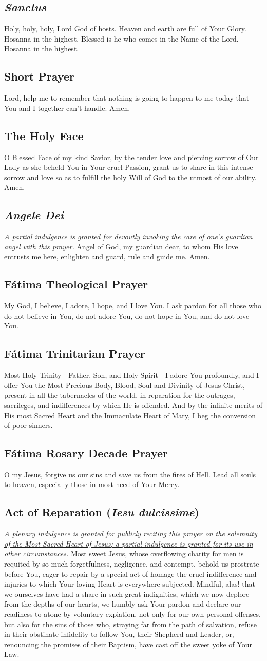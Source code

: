 \documentclass[12pt]{article}
\newcommand{\prayertitle}[1]{\subsection{#1}}
\newcommand{\indulgencedprayertitle}[1]{\prayertitle{#1 \protect\kreuz}}
\newcommand{\emphasis}[1]{\emph{#1}}
\newcommand{\emphasis}[1]{\textsl{#1}}
\newcommand{\foreign}[1]{\emphasis{#1}}
\newcommand{\note}[1]{{\small{\emphasis{#1}}}\newline}
\newcommand{\linkednote}[2]{\hyperlink{#1}{\note{#2}}}
\begin{document}
\prayertitle{\foreign{Sanctus}}
\label{prayer:sanctus}
Holy, holy, holy, Lord God of hosts.
Heaven and earth are full of Your Glory.
Hosanna in the highest.
Blessed is he who comes in the Name of the Lord.
Hosanna in the highest.

\prayertitle{Short Prayer}
\label{prayer:short}
Lord, help me to remember that nothing is going to happen to me today that You and I together can't handle. Amen.

\prayertitle{The Holy Face}
\label{prayer:holy_face}
O Blessed Face of my kind Savior, by the tender love and piercing sorrow of Our Lady as she beheld You in Your cruel Passion, grant us to share in this intense sorrow and love
so as to fulfill the holy Will of God to the utmost of our ability.
Amen.

\indulgencedprayertitle{\foreign{Angele Dei}}
\linkednote{grant18}{A partial indulgence is granted for devoutly invoking the care of one's guardian angel with this prayer.}
Angel of God, my guardian dear, to whom His love entrusts me here, enlighten and guard, rule and guide me. Amen.

\prayertitle{F\'{a}tima Theological Prayer}
My God, I believe, I adore, I hope, and I love You. I ask pardon for all those who do not believe in You, do not adore You, do not hope in You, and do not love You.

\prayertitle{F\'{a}tima Trinitarian Prayer}
Most Holy Trinity - Father, Son, and Holy Spirit - I adore You profoundly, and I offer You the Most Precious Body, Blood, Soul and Divinity of Jesus Christ, present in all the tabernacles of the world, in reparation for the outrages, sacrileges, and indifferences by which He is offended.
And by the infinite merits of His most Sacred Heart and the Immaculate Heart of Mary, I beg the conversion of poor sinners.

\prayertitle{F\'{a}tima Rosary Decade Prayer}
O my Jesus, forgive us our sins and save us from the fires of Hell.
Lead all souls to heaven, especially those in most need of Your Mercy.

\indulgencedprayertitle{Act of Reparation (\foreign{Iesu dulcissime})}
\linkednote{grant3}{A plenary indulgence is granted for publicly reciting this prayer on the solemnity of the Most Sacred Heart of Jesus;
a partial indulgence is granted for its use in other circumstances.}
Most sweet Jesus, whose overflowing charity for men is requited by so much forgetfulness, negligence, and contempt, behold us prostrate before You, eager to repair by a special act of homage the cruel indifference and injuries to which Your loving Heart is everywhere subjected.
Mindful, alas! that we ourselves have had a share in such great indignities, which we now deplore from the depths of our hearts, we humbly ask Your pardon and declare our readiness to atone by voluntary expiation, not only for our own personal offenses, but also for the sins of those who, straying far from the path of salvation, refuse in their obstinate infidelity to follow You, their Shepherd and Leader, or, renouncing the promises of their Baptism, have cast off the sweet yoke of Your Law.
\end{document}
